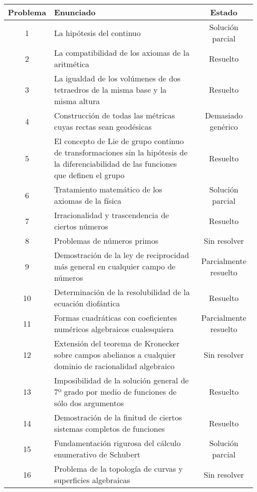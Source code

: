 \begin{longtable}{|c|p{7cm}|c|} \toprule
  \centering
    Problema & Enunciado & Estado \\ \midrule \midrule
    1 & La hipótesis del continuo & Solución parcial \\ \midrule 
    2 & La compatibilidad de los axiomas de la aritmética & Resuelto \\ \midrule 
    3 & La igualdad de los volúmenes de dos 
        tetraedros de la misma base y la misma altura & Resuelto \\ \midrule 
    4 & Construcción de todas las métricas cuyas rectas sean geodésicas & Demasiado genérico \\ \midrule
    5 & El concepto de Lie de grupo continuo de transformaciones sin 
        la hipótesis de la diferenciabilidad de las funciones que 
        definen el grupo & Resuelto \\ \midrule
    6 & Tratamiento matemático de los axiomas de la física & Solución parcial \\ \midrule
    7 & Irracionalidad y trascendencia de ciertos números & Resuelto \\ \midrule
    8 & Problemas de números primos & Sin resolver \\ \midrule
    9 & Demostración de la ley de reciprocidad más 
        general en cualquier campo de números & Parcialmente resuelto \\ \midrule
    10 & Determinación de la resolubilidad de la ecuación diofántica & Resuelto \\ \midrule
    11 & Formas cuadráticas con coeficientes numéricos 
        algebraicos cualesquiera & Parcialmente resuelto \\ \midrule
    12 & Extensión del teorema de Kronecker sobre campos abelianos 
        a cualquier dominio de racionalidad algebraico & Sin resolver \\ \midrule
    13 & Imposibilidad de la solución general de 7º
        grado por medio de funciones de sólo dos argumentos & Resuelto \\ \midrule
    14 & Demostración de la finitud de ciertos sistemas completos de funciones & Resuelto \\ \midrule
    15 & Fundamentación rigurosa del cálculo enumerativo de Schubert & Solución parcial\\ \midrule
    16 & Problema de la topología de curvas y superficies algebraicas & Sin resolver \\ \midrule

\end{longtable}
